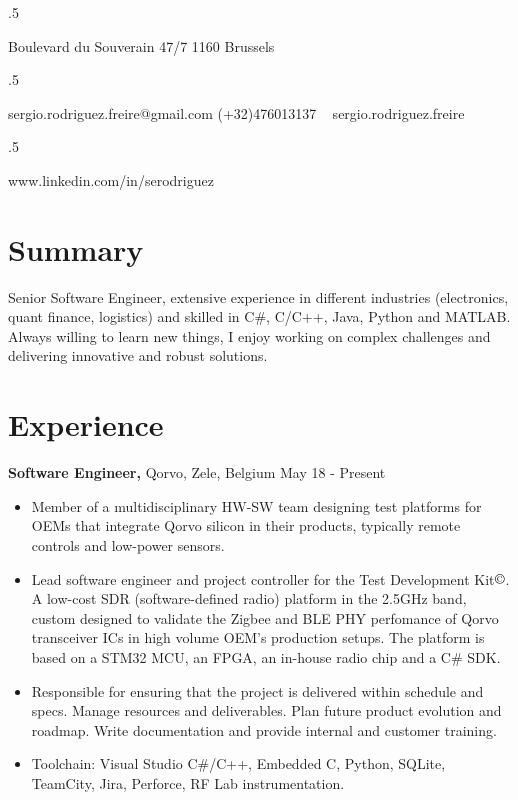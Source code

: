 \documentclass[margin]{res}
\begin{document}

\begin{resume}

\moveleft.5\hoffset\centerline{Boulevard du Souverain 47/7 1160 Brussels}
\moveleft.5\hoffset\centerline{sergio.rodriguez.freire@gmail.com \hspace{2 mm} \Mobilefone \hspace{1 mm} (+32)476013137 \hspace{2 mm} \faSkype\ \hspace{1 mm} sergio.rodriguez.freire}
\moveleft.5\hoffset\centerline{\faLinkedin \hspace{1 mm} www.linkedin.com/in/serodriguez}


\section{Summary}
Senior Software Engineer, extensive experience in different industries (electronics, quant finance, logistics) and skilled in C\#, C/C++, Java, Python and MATLAB. Always willing to learn new things, I enjoy working on complex challenges and delivering innovative and robust solutions. 

\section{Experience}

 {\bf Software Engineer,} Qorvo, Zele, Belgium \hfill May 18 - Present
 \begin{itemize} \itemsep -2pt
 \item Member of a multidisciplinary HW-SW team designing test platforms for OEMs that integrate Qorvo silicon in their products, typically remote controls and low-power sensors.
 \item Lead software engineer and project controller for the Test Development Kit$\copyright$. A low-cost SDR (software-defined radio) platform in the 2.5GHz band, custom designed to validate the Zigbee and BLE PHY perfomance of Qorvo transceiver ICs in high volume OEM's production setups. The platform is based on a STM32 MCU, an FPGA, an in-house radio chip and a C\# SDK.
 \item Responsible for ensuring that the project is delivered within schedule and specs. Manage resources and deliverables. Plan future product evolution and roadmap. Write documentation and provide internal and customer training.
 \item Toolchain: Visual Studio C\#/C++, Embedded C, Python, SQLite, TeamCity, Jira, Perforce, RF Lab instrumentation.
\end{itemize}


\end{resume}
\end{document}
